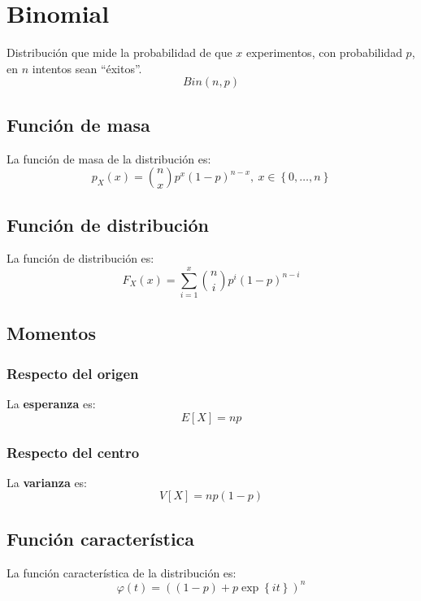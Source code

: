 \section{Binomial}
\label{sec:binomial}
Distribución que mide la probabilidad de que $x$ experimentos, con probabilidad $p$, en $n$ intentos sean ``éxitos''. 
\[
Bin\left( n, p \right)
\]

\subsection{Función de masa}
La función de masa de la distribución es:
\[
p_X \left( x \right) = \binom{n}{x} p^x \left( 1-p \right)^{n-x},\ x \in \left\{ 0, \ldots, n \right\}
\]

\subsection{Función de distribución}
La función de distribución es:
\[
F_X\left( x \right) = \sum_{i=1}^{x} \binom{n}{i} p^i \left( 1-p \right)^{n-i}
\]

\subsection{Momentos}

\subsubsection*{Respecto del origen}
La \textbf{esperanza} es: 
\[
    E\left[ X \right] = np
\]
\subsubsection*{Respecto del centro}
La \textbf{varianza} es:
\[
    V\left[ X \right] = np\left( 1-p \right)
\]

\subsection{Función característica}
La función característica de la distribución es:
\[
\varphi\left( t \right) = \left( \left( 1-p \right) + p \exp\left\{ it \right\} \right)^n
\]

